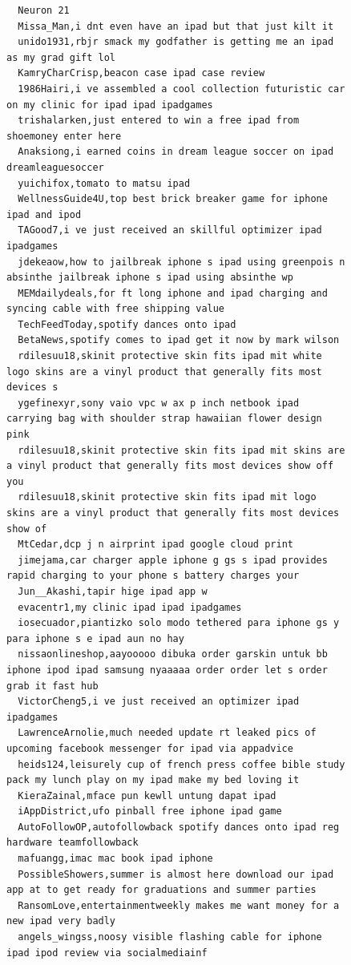 \begin{figure}[htpb]
\begin{verbatim}
  Neuron 21
  Missa_Man,i dnt even have an ipad but that just kilt it
  unido1931,rbjr smack my godfather is getting me an ipad as my grad gift lol
  KamryCharCrisp,beacon case ipad case review
  1986Hairi,i ve assembled a cool collection futuristic car on my clinic for ipad ipad ipadgames
  trishalarken,just entered to win a free ipad from shoemoney enter here
  Anaksiong,i earned coins in dream league soccer on ipad dreamleaguesoccer
  yuichifox,tomato to matsu ipad
  WellnessGuide4U,top best brick breaker game for iphone ipad and ipod
  TAGood7,i ve just received an skillful optimizer ipad ipadgames
  jdekeaow,how to jailbreak iphone s ipad using greenpois n absinthe jailbreak iphone s ipad using absinthe wp
  MEMdailydeals,for ft long iphone and ipad charging and syncing cable with free shipping value
  TechFeedToday,spotify dances onto ipad
  BetaNews,spotify comes to ipad get it now by mark wilson
  rdilesuu18,skinit protective skin fits ipad mit white logo skins are a vinyl product that generally fits most devices s
  ygefinexyr,sony vaio vpc w ax p inch netbook ipad carrying bag with shoulder strap hawaiian flower design pink
  rdilesuu18,skinit protective skin fits ipad mit skins are a vinyl product that generally fits most devices show off you
  rdilesuu18,skinit protective skin fits ipad mit logo skins are a vinyl product that generally fits most devices show of
  MtCedar,dcp j n airprint ipad google cloud print
  jimejama,car charger apple iphone g gs s ipad provides rapid charging to your phone s battery charges your
  Jun__Akashi,tapir hige ipad app w
  evacentr1,my clinic ipad ipad ipadgames
  iosecuador,piantizko solo modo tethered para iphone gs y para iphone s e ipad aun no hay
  nissaonlineshop,aayooooo dibuka order garskin untuk bb iphone ipod ipad samsung nyaaaaa order order let s order grab it fast hub
  VictorCheng5,i ve just received an optimizer ipad ipadgames
  LawrenceArnolie,much needed update rt leaked pics of upcoming facebook messenger for ipad via appadvice
  heids124,leisurely cup of french press coffee bible study pack my lunch play on my ipad make my bed loving it
  KieraZainal,mface pun kewll untung dapat ipad
  iAppDistrict,ufo pinball free iphone ipad game
  AutoFollowOP,autofollowback spotify dances onto ipad reg hardware teamfollowback
  mafuangg,imac mac book ipad iphone
  PossibleShowers,summer is almost here download our ipad app at to get ready for graduations and summer parties
  RansomLove,entertainmentweekly makes me want money for a new ipad very badly
  angels_wingss,noosy visible flashing cable for iphone ipad ipod review via socialmediainf

\end{verbatim}
\end{figure}
